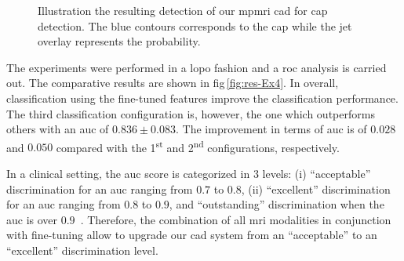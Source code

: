 \documentclass[conference]{sty/ieeeconf}
\begin{document}
\begin{figure}
  \hspace*{\fill}
 \hfill
 \hspace*{\fill}
  \caption[Illustration the resulting detection of our \acs*{mpmri}
  \acs*{cad} for \acs*{cap} detection.]{Illustration the resulting
    detection of our \acs*{mpmri} \acs*{cad} for \acs*{cap}
    detection. The blue contours corresponds to the \ac{cap} while the
    jet overlay represents the probability.}
  \label{fig:resultcad}
\end{figure}

The experiments were performed in a \ac{lopo} fashion and a \ac{roc}
analysis is carried out.
The comparative results are shown in \acs{fig}\,\ref{fig:res-Ex4}.
In overall, classification using the fine-tuned features improve the
classification performance.
The third classification configuration is, however, the one which
outperforms others with an \ac{auc} of $0.836 \pm 0.083$.
The improvement in terms of \ac{auc} is of $0.028$ and $0.050$
compared with the 1\textsuperscript{st} and 2\textsuperscript{nd}
configurations, respectively.

In a clinical setting, the \ac{auc} score is categorized in 3 levels:
(i) ``acceptable'' discrimination for an \ac{auc} ranging from $0.7$
to $0.8$, (ii) ``excellent'' discrimination for an \ac{auc} ranging
from $0.8$ to $0.9$, and ``outstanding'' discrimination when the
\ac{auc} is over $0.9$~\cite{hosmer2004applied}.
Therefore, the combination of all \ac{mri} modalities in conjunction
with fine-tuning allow to upgrade our \ac{cad} system from an
``acceptable'' to an ``excellent'' discrimination level.
\end{document}
